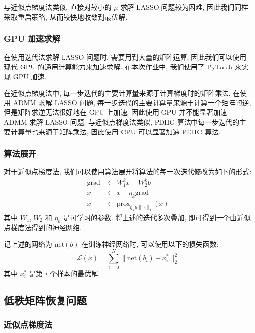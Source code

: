 \documentclass{article}
\begin{document}
与近似点梯度法类似, 直接对较小的 $\mu$ 求解 LASSO 问题较为困难, 因此我们同样采取重启策略, 从而较快地收敛到最优解.

\subsubsection{GPU 加速求解}

在使用迭代法求解 LASSO 问题时, 需要用到大量的矩阵运算, 因此我们可以使用现代 GPU 的通用计算能力来加速求解. 在本次作业中, 我们使用了 \href{https://pytorch.org/}{PyTorch} 来实现 GPU 加速.

在近似点梯度法中, 每一步迭代的主要计算量来源于计算梯度时的矩阵乘法. 在使用 ADMM 求解 LASSO 问题, 每一步迭代的主要计算量来源于计算一个矩阵的逆, 但是矩阵求逆无法很好地在 GPU 上加速, 因此使用 GPU 并不能显著加速 ADMM 求解 LASSO 问题. 与近似点梯度法类似, PDHG 算法中每一步迭代的主要计算量也来源于矩阵乘法, 因此使用 GPU 可以显著加速 PDHG 算法.

\subsubsection{算法展开}

对于近似点梯度法, 我们可以使用算法展开将算法的每一次迭代修改为如下的形式:
\begin{equation*}
    \begin{aligned}
        \text{grad} &\gets W_1^k x + W_2^k b\\
        x &\gets x - \eta_k\text{grad}\\
        x &\gets \text{prox}_{\eta_k\mu\|\cdot\|_1}(x)
    \end{aligned}
\end{equation*}
其中 $W_1$, $W_2$ 和 $\eta_k$ 是可学习的参数. 将上述的迭代多次叠加, 即可得到一个由近似点梯度法得到的神经网络.

记上述的网络为 $\text{net}(b)$ 在训练神经网络时, 可以使用以下的损失函数:
\begin{equation*}
    \mathcal{L}(x) = \sum_{i=0}^{N} \|\text{net}(b_i) - x_i^*\|_2^2
\end{equation*}
其中 $x_i^*$ 是第 $i$ 个样本的最优解.

\subsection{低秩矩阵恢复问题}

\subsubsection{近似点梯度法}
\end{document}
